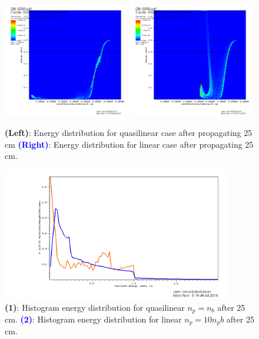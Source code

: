 \documentclass[%
onecolumn, notitlepage,
 amsmath,amssymb,
 aps,
]{article}
\begin{document}
\begin{figure}[!ht]
\centering
\includegraphics[width=0.49\textwidth]{visit0035.png}
\includegraphics[width=0.49\textwidth]{visit0033.png}
\caption{\textcolor{Orange2}{\textbf{(Left)}}{: Energy distribution for quasilinear case after propagating 25 cm} \textcolor{blue}{\textbf{(Right)}}{: Energy distribution for linear case after propagating 25 cm.}}
\end{figure}
\begin{figure}[!ht]
\centering
\includegraphics[width=0.9\textwidth]{visit0037.png}
\caption{\textcolor{Orange2}{\textbf{(1)}}{: Histogram energy distribution for quasilinear $n_p=n_b$ after 25 cm.} \textcolor{blue}{\textbf{(2)}}{: Histogram energy distribution for linear $n_p=10n_pb$ after 25 cm.}}
\end{figure}
\clearpage
\end{document}
